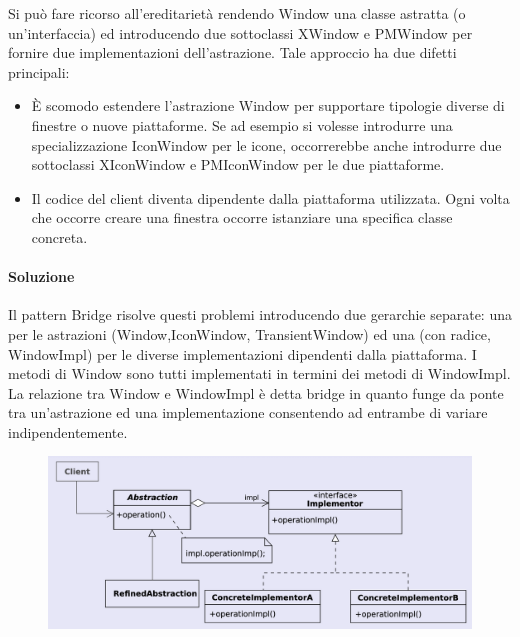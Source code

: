 Si può fare ricorso all’ereditarietà rendendo Window una classe astratta (o un’interfaccia) ed introducendo due sottoclassi XWindow e PMWindow per fornire due implementazioni dell’astrazione. Tale approccio ha due difetti principali:

\begin{itemize}
    \item È scomodo estendere l’astrazione Window per supportare tipologie diverse di finestre o nuove piattaforme. Se ad esempio si volesse introdurre una specializzazione IconWindow per le icone, occorrerebbe anche introdurre due sottoclassi XIconWindow e PMIconWindow per le due piattaforme.
    \item Il codice del client diventa dipendente dalla piattaforma utilizzata. Ogni volta che occorre creare una finestra occorre istanziare una specifica classe concreta.
\end{itemize}

\paragraph{Soluzione} Il pattern Bridge risolve questi problemi introducendo due gerarchie separate: una per le astrazioni (Window,IconWindow, TransientWindow) ed una (con radice, WindowImpl) per le diverse implementazioni dipendenti dalla piattaforma. I metodi di Window sono tutti implementati in termini dei metodi di WindowImpl. La relazione tra Window e WindowImpl è detta bridge in quanto funge da ponte tra un’astrazione ed una implementazione consentendo ad entrambe di variare indipendentemente.

\begin{figure}[H]
    \centering
    \includegraphics[width=1\linewidth]{assets/pattern/bridge/bridge-struttura.png}
\end{figure}

